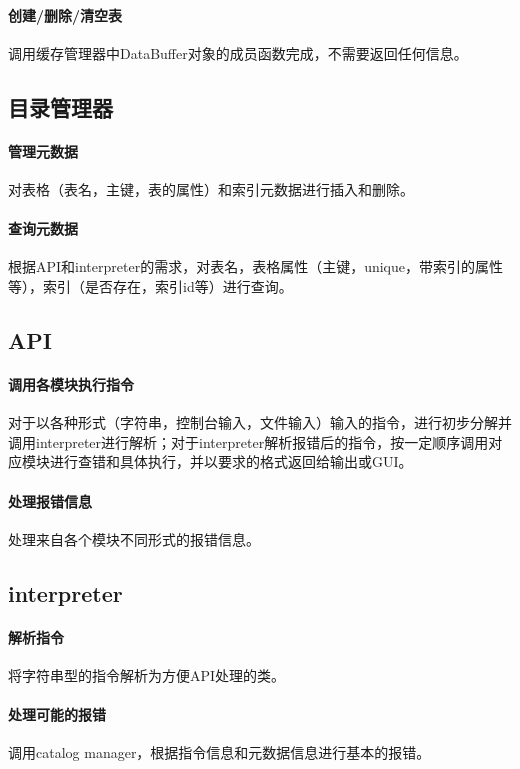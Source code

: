 \documentclass[UTF8]{ctexrep} %
\begin{document}
\paragraph{创建/删除/清空表}
调用缓存管理器中DataBuffer对象的成员函数完成，不需要返回任何信息。

\subsection{目录管理器}
\paragraph{管理元数据}	
对表格（表名，主键，表的属性）和索引元数据进行插入和删除。

\paragraph{查询元数据}
根据API和interpreter的需求，对表名，表格属性（主键，unique，带索引的属性等），索引（是否存在，索引id等）进行查询。

\subsection{API}
\paragraph{调用各模块执行指令}	
对于以各种形式（字符串，控制台输入，文件输入）输入的指令，进行初步分解并调用interpreter进行解析；对于interpreter解析报错后的指令，按一定顺序调用对应模块进行查错和具体执行，并以要求的格式返回给输出或GUI。

\paragraph{处理报错信息}
处理来自各个模块不同形式的报错信息。

\subsection{interpreter}
\paragraph{解析指令}	
将字符串型的指令解析为方便API处理的类。

\paragraph{处理可能的报错}
调用catalog manager，根据指令信息和元数据信息进行基本的报错。
\end{document}
